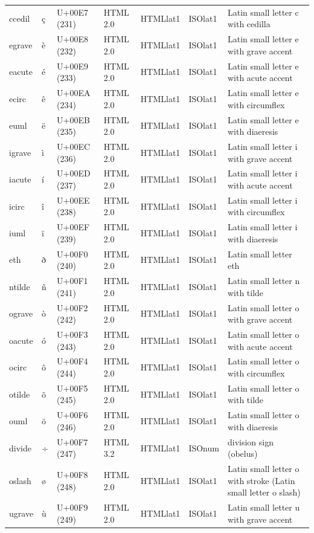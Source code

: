 \documentclass{article}
\begin{document}
\begin{tabular}{lllllll}
ccedil & ç & U+00E7 (231) & HTML 2.0 & HTMLlat1 & ISOlat1 & Latin small letter c with cedilla \\
egrave & è & U+00E8 (232) & HTML 2.0 & HTMLlat1 & ISOlat1 & Latin small letter e with grave accent \\
eacute & é & U+00E9 (233) & HTML 2.0 & HTMLlat1 & ISOlat1 & Latin small letter e with acute accent \\
ecirc & ê & U+00EA (234) & HTML 2.0 & HTMLlat1 & ISOlat1 & Latin small letter e with circumflex \\
euml & ë & U+00EB (235) & HTML 2.0 & HTMLlat1 & ISOlat1 & Latin small letter e with diaeresis \\
igrave & ì & U+00EC (236) & HTML 2.0 & HTMLlat1 & ISOlat1 & Latin small letter i with grave accent \\
iacute & í & U+00ED (237) & HTML 2.0 & HTMLlat1 & ISOlat1 & Latin small letter i with acute accent \\
icirc & î & U+00EE (238) & HTML 2.0 & HTMLlat1 & ISOlat1 & Latin small letter i with circumflex \\
iuml & ï & U+00EF (239) & HTML 2.0 & HTMLlat1 & ISOlat1 & Latin small letter i with diaeresis \\
eth & ð & U+00F0 (240) & HTML 2.0 & HTMLlat1 & ISOlat1 & Latin small letter eth \\
ntilde & ñ & U+00F1 (241) & HTML 2.0 & HTMLlat1 & ISOlat1 & Latin small letter n with tilde \\
ograve & ò & U+00F2 (242) & HTML 2.0 & HTMLlat1 & ISOlat1 & Latin small letter o with grave accent \\
oacute & ó & U+00F3 (243) & HTML 2.0 & HTMLlat1 & ISOlat1 & Latin small letter o with acute accent \\
ocirc & ô & U+00F4 (244) & HTML 2.0 & HTMLlat1 & ISOlat1 & Latin small letter o with circumflex \\
otilde & õ & U+00F5 (245) & HTML 2.0 & HTMLlat1 & ISOlat1 & Latin small letter o with tilde \\
ouml & ö & U+00F6 (246) & HTML 2.0 & HTMLlat1 & ISOlat1 & Latin small letter o with diaeresis \\
divide & ÷ & U+00F7 (247) & HTML 3.2 & HTMLlat1 & ISOnum & division sign (obelus) \\
oslash & ø & U+00F8 (248) & HTML 2.0 & HTMLlat1 & ISOlat1 & Latin small letter o with stroke (Latin small letter o slash) \\
ugrave & ù & U+00F9 (249) & HTML 2.0 & HTMLlat1 & ISOlat1 & Latin small letter u with grave accent \\

\end{tabular}
\end{document}

